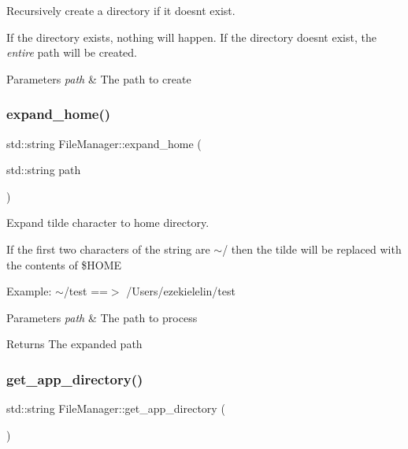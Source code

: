 Recursively create a directory if it doesn\textquotesingle{}t exist. 

If the directory exists, nothing will happen. If the directory doesn\textquotesingle{}t exist, the {\itshape entire} path will be created.


\begin{DoxyParams}{Parameters}
{\em path} & The path to create \\
\hline
\end{DoxyParams}
\mbox{\label{class_file_manager_a129c4b18fe9f4ebff19c4e15ed6b18ba}} 
\subsubsection{\texorpdfstring{expand\+\_\+home()}{expand\_home()}}
{\footnotesize\ttfamily std\+::string File\+Manager\+::expand\+\_\+home (\begin{DoxyParamCaption}\item[{std\+::string}]{path }\end{DoxyParamCaption})\hspace{0.3cm}{\ttfamily [static]}}



Expand tilde character to home directory. 

If the first two characters of the string are {\ttfamily $\sim$/} then the tilde will be replaced with the contents of \$\+H\+O\+ME

Example\+: {\ttfamily $\sim$/test} ==$>$ {\ttfamily /\+Users/ezekielelin/test}


\begin{DoxyParams}{Parameters}
{\em path} & The path to process \\
\hline
\end{DoxyParams}
\begin{DoxyReturn}{Returns}
The expanded path 
\end{DoxyReturn}
\mbox{\label{class_file_manager_adcdb52224d9e277f6be2a971ed92ea85}} 
\subsubsection{\texorpdfstring{get\+\_\+app\+\_\+directory()}{get\_app\_directory()}}
{\footnotesize\ttfamily std\+::string File\+Manager\+::get\+\_\+app\+\_\+directory (\begin{DoxyParamCaption}{ }\end{DoxyParamCaption})\hspace{0.3cm}{\ttfamily [static]}}



